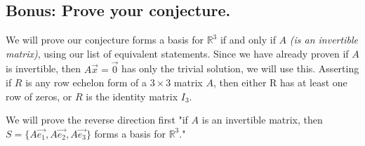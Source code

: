 \documentclass[../main.tex]{subfiles}
\begin{document}
\subsection{Bonus: Prove your conjecture.}
We will prove our conjecture  forms a basis for $\mathbb{R}^3$ if and only if $A$ \emph{(is an invertible matrix)}, using our list of equivalent statements. Since we have already proven if $A$ is invertible, then $A\vec{x}=\vec{0}$ has only the trivial solution, we will use this. Asserting if $R$ is any row echelon form of a $3 \times3$ matrix $A$, then either R has at least one row of zeros, or $R$ is the identity matrix $I_3$.

We will prove the reverse direction first "if $A$ is an invertible matrix, then $S = \{A\vec{e_1},A\vec{e_2},A\vec{e_3} \}$ forms a basis for $\mathbb{R}^3$."
\end{document}
